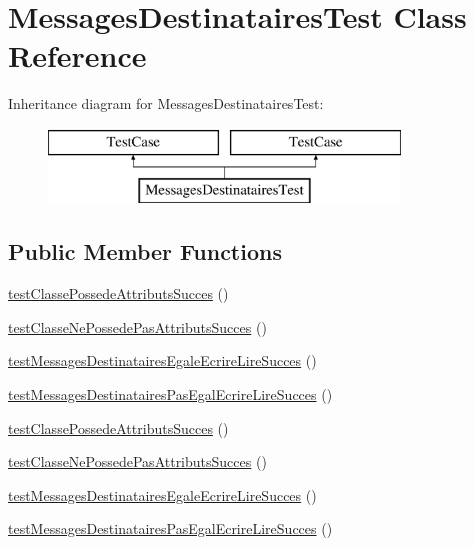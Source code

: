 \hypertarget{class_messages_destinataires_test}{}\section{Messages\+Destinataires\+Test Class Reference}
\label{class_messages_destinataires_test}
Inheritance diagram for Messages\+Destinataires\+Test\+:\begin{figure}[H]
\begin{center}
\leavevmode
\includegraphics[height=2.000000cm]{class_messages_destinataires_test}
\end{center}
\end{figure}
\subsection*{Public Member Functions}
\begin{DoxyCompactItemize}
\item 
\hyperlink{class_messages_destinataires_test_a1ff8e8ede1b545aa3e948731ca225d4e}{test\+Classe\+Possede\+Attributs\+Succes} ()
\item 
\hyperlink{class_messages_destinataires_test_ab1e3a6591fbabb0107e3bcecac98f004}{test\+Classe\+Ne\+Possede\+Pas\+Attributs\+Succes} ()
\item 
\hyperlink{class_messages_destinataires_test_ae1e2fa4ac568e7aeffe3e158dca49bac}{test\+Messages\+Destinataires\+Egale\+Ecrire\+Lire\+Succes} ()
\item 
\hyperlink{class_messages_destinataires_test_a176c681d7d5638b906154d55ac7effa2}{test\+Messages\+Destinataires\+Pas\+Egal\+Ecrire\+Lire\+Succes} ()
\item 
\hyperlink{class_messages_destinataires_test_a1ff8e8ede1b545aa3e948731ca225d4e}{test\+Classe\+Possede\+Attributs\+Succes} ()
\item 
\hyperlink{class_messages_destinataires_test_ab1e3a6591fbabb0107e3bcecac98f004}{test\+Classe\+Ne\+Possede\+Pas\+Attributs\+Succes} ()
\item 
\hyperlink{class_messages_destinataires_test_ae1e2fa4ac568e7aeffe3e158dca49bac}{test\+Messages\+Destinataires\+Egale\+Ecrire\+Lire\+Succes} ()
\item 
\hyperlink{class_messages_destinataires_test_a176c681d7d5638b906154d55ac7effa2}{test\+Messages\+Destinataires\+Pas\+Egal\+Ecrire\+Lire\+Succes} ()
\end{DoxyCompactItemize}



